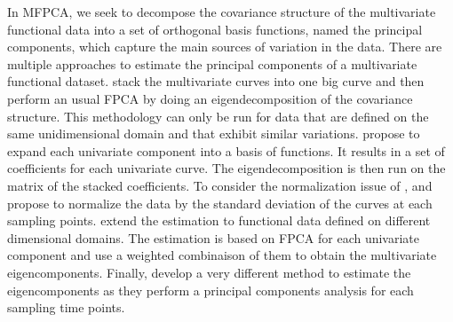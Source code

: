 In MFPCA, we seek to decompose the covariance structure of the multivariate functional data into a set of orthogonal basis functions, named the principal components, which capture the main sources of variation in the data. There are multiple approaches to estimate the principal components of a multivariate functional dataset. \cite{ramsayFunctionalDataAnalysis2005} stack the multivariate curves into one big curve and then perform an usual FPCA by doing an eigendecomposition of the covariance structure. This methodology can only be run for data that are defined on the same unidimensional domain and that exhibit similar variations. \cite{jacquesModelbasedClusteringMultivariate2014a} propose to expand each univariate component into a basis of functions. It results in a set of coefficients for each univariate curve. The eigendecomposition is then run on the matrix of the stacked coefficients. To consider the normalization issue of \cite{ramsayFunctionalDataAnalysis2005}, \cite{jacquesModelbasedClusteringMultivariate2014a} and \cite{chiouMultivariateFunctionalPrincipal2014} propose to normalize the data by the standard deviation of the curves at each sampling points. \cite{happMultivariateFunctionalPrincipal2018a} extend the estimation to functional data defined on different dimensional domains. The estimation is based on FPCA for each univariate component and use a weighted combinaison of them to obtain the multivariate eigencomponents. Finally, \cite{berrenderoPrincipalComponentsMultivariate2011} develop a very different method to estimate the eigencomponents as they perform a principal components analysis for each sampling time points.

